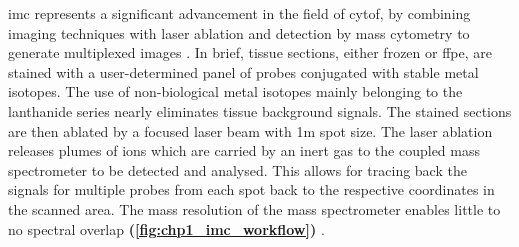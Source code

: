 \par \gls{imc} represents a significant advancement in the field of \gls{cytof}, by combining imaging techniques with laser ablation and detection by mass cytometry to generate multiplexed images \textbf{\cite{veenstra_research_2021,chang_imaging_2017}}. In brief, tissue sections, either frozen or \gls{ffpe}, are stained with a user-determined panel of probes conjugated with stable metal isotopes. The use of non-biological metal isotopes mainly belonging to the lanthanide series nearly eliminates tissue background signals. The stained sections are then ablated by a focused laser beam with 1\textmu m spot size. The laser ablation releases plumes of ions which are carried by an inert gas to the coupled mass spectrometer to be detected and analysed. This allows for tracing back the signals for multiple probes from each spot back to the respective coordinates in the scanned area. The mass resolution of the mass spectrometer enables little to no spectral overlap \textbf{(\autoref{fig:chp1_imc_workflow})} \textbf{\cite{veenstra_research_2021,chang_imaging_2017}}.\\







